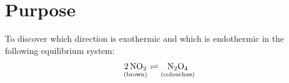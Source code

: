 
\section{Purpose}
To discover which direction is exothermic and which is endothermic in the following equilibrium system:
$$\rxn$$
